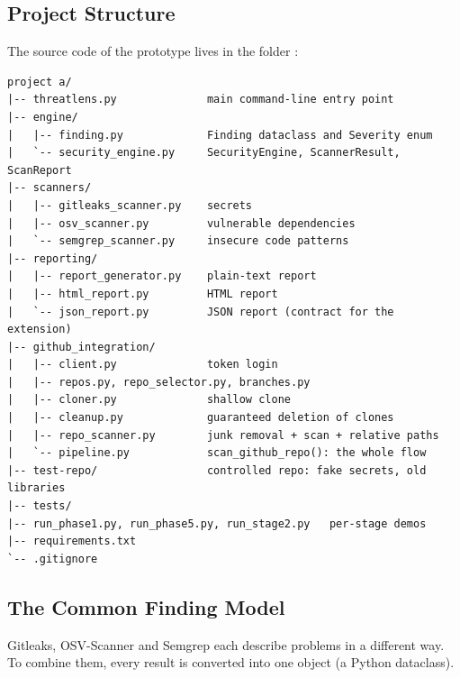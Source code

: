 \documentclass[12pt,a4paper]{article}
\newcommand{\code}[1]{\texttt{\detokenize{#1}}}
\begin{document}
\subsection{Project Structure}

The source code of the prototype lives in the folder \code{project a}:

\begin{lstlisting}[language={},caption={Folder structure of the prototype},label={lst:tree}]
project a/
|-- threatlens.py              main command-line entry point
|-- engine/
|   |-- finding.py             Finding dataclass and Severity enum
|   `-- security_engine.py     SecurityEngine, ScannerResult, ScanReport
|-- scanners/
|   |-- gitleaks_scanner.py    secrets
|   |-- osv_scanner.py         vulnerable dependencies
|   `-- semgrep_scanner.py     insecure code patterns
|-- reporting/
|   |-- report_generator.py    plain-text report
|   |-- html_report.py         HTML report
|   `-- json_report.py         JSON report (contract for the extension)
|-- github_integration/
|   |-- client.py              token login
|   |-- repos.py, repo_selector.py, branches.py
|   |-- cloner.py              shallow clone
|   |-- cleanup.py             guaranteed deletion of clones
|   |-- repo_scanner.py        junk removal + scan + relative paths
|   `-- pipeline.py            scan_github_repo(): the whole flow
|-- test-repo/                 controlled repo: fake secrets, old libraries
|-- tests/
|-- run_phase1.py, run_phase5.py, run_stage2.py   per-stage demos
|-- requirements.txt
`-- .gitignore
\end{lstlisting}

\subsection{The Common Finding Model}

Gitleaks, OSV-Scanner and Semgrep each describe problems in a different way. To combine them, every result is converted into one \code{Finding} object (a Python dataclass).
\end{document}
